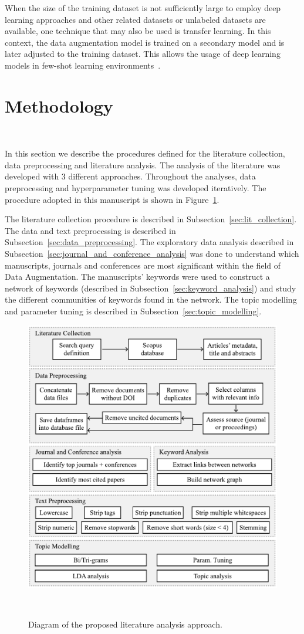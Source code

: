 \documentclass[pdflatex,sn-mathphys]{sn-jnl}%
\theoremstyle{thmstyleone}
\theoremstyle{thmstyletwo}
\theoremstyle{thmstylethree}
\begin{document}
When the size of the training dataset is not sufficiently large to employ deep
learning approaches and other related datasets or unlabeled datasets are
available, one technique that may also be used is transfer learning. In this
context, the data augmentation model is trained on a secondary model and is
later adjusted to the training dataset. This allows the usage of deep learning
models in few-shot learning environments~\cite{Antoniou2017}.

\section{Methodology}~\label{sec:methodology}

In this section we describe the procedures defined for the literature
collection, data preprocessing and literature analysis. The analysis of the
literature was developed with 3 different approaches. Throughout the
analyses, data preprocessing and hyperparameter tuning was developed
iteratively. The procedure adopted in this manuscript is shown in
Figure~\ref{fig:slr_diagram}.

The literature collection procedure is described in
Subsection~\ref{sec:lit_collection}. The data and text preprocessing is
described in Subsection~\ref{sec:data_preprocessing}. The exploratory data
analysis described in Subsection~\ref{sec:journal_and_conference_analysis} was
done to understand which manuscripts, journals and conferences are most
significant within the field of Data Augmentation. The manuscripts' keywords
were used to construct a network of keywords (described in
Subsection~\ref{sec:keyword_analysis}) and study the different communities of
keywords found in the network. The topic modelling and parameter tuning is
described in Subsection~\ref{sec:topic_modelling}. 

\begin{figure}[H]
	\centering
	\includegraphics[width=.85\linewidth]{../analysis/slr_diagram}
    \caption{Diagram of the proposed literature analysis approach.
    }~\label{fig:slr_diagram}
\end{figure}
\end{document}
